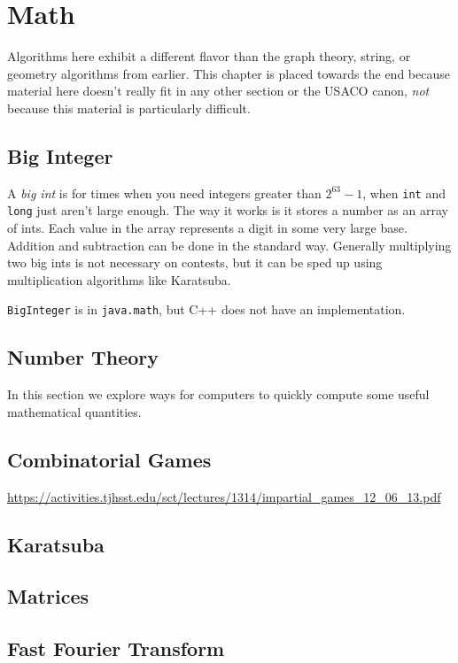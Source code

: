 \chapter{Math}

Algorithms here exhibit a different flavor than the graph theory, string, or geometry algorithms from earlier. This chapter is placed towards the end because material here doesn't really fit in any other section or the USACO canon, \textit{not} because this material is particularly difficult.

\section{Big Integer}

A \textit{big int} is for times when you need integers greater than $2^{63}-1$, when \texttt{int} and \texttt{long} just aren't large enough. The way it works is it stores a number as an array of ints. Each value in the array represents a digit in some very large base. Addition and subtraction can be done in the standard way. Generally multiplying two big ints is not necessary on contests, but it can be sped up using multiplication algorithms like Karatsuba.

\texttt{BigInteger} is in \texttt{java.math}, but C++ does not have an implementation.

\section{Number Theory}

In this section we explore ways for computers to quickly compute some useful mathematical quantities.

\section{Combinatorial Games}

\url{https://activities.tjhsst.edu/sct/lectures/1314/impartial_games_12_06_13.pdf}

\section{Karatsuba}

\section{Matrices}

\section{Fast Fourier Transform}